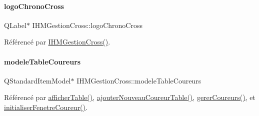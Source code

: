 \mbox{\label{class_i_h_m_gestion_cross_a2025ba71cf1bdbfbec56a8f5552d7a83}} 
\paragraph{\texorpdfstring{logo\+Chrono\+Cross}{logoChronoCross}}
{\footnotesize\ttfamily Q\+Label$\ast$ I\+H\+M\+Gestion\+Cross\+::logo\+Chrono\+Cross\hspace{0.3cm}{\ttfamily [private]}}



Référencé par \hyperlink{class_i_h_m_gestion_cross_a2c62fd83326a87456a403f46acc408c8}{I\+H\+M\+Gestion\+Cross()}.

\mbox{\label{class_i_h_m_gestion_cross_ad9560c4804694dbbf969de5f6f56eb30}} 
\paragraph{\texorpdfstring{modele\+Table\+Coureurs}{modeleTableCoureurs}}
{\footnotesize\ttfamily Q\+Standard\+Item\+Model$\ast$ I\+H\+M\+Gestion\+Cross\+::modele\+Table\+Coureurs\hspace{0.3cm}{\ttfamily [private]}}



Référencé par \hyperlink{class_i_h_m_gestion_cross_ae1510779a1efa3defecb517467e84f91}{afficher\+Table()}, \hyperlink{class_i_h_m_gestion_cross_aa3e6f06ff2f4e724e2f0688528bcf386}{ajouter\+Nouveau\+Coureur\+Table()}, \hyperlink{class_i_h_m_gestion_cross_ad46a2295500cf98dbc18f862f6020103}{gerer\+Coureurs()}, et \hyperlink{class_i_h_m_gestion_cross_aa5d9de499a66e52b843c4ef4c6074a60}{initialiser\+Fenetre\+Coureur()}.

\mbox{\label{class_i_h_m_gestion_cross_a19565551280115e642ceb9790c7317bc}} 
